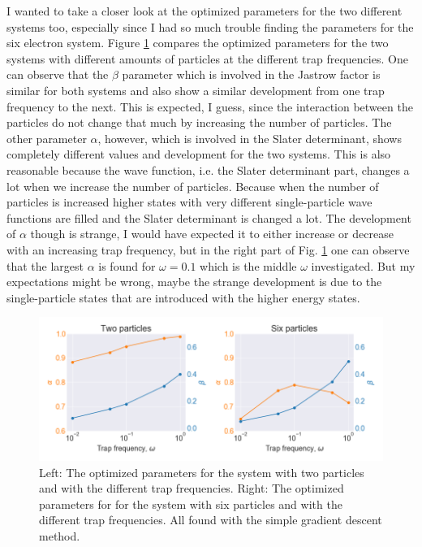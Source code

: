 I wanted to take a closer look at the optimized parameters for the two different systems too, especially since I had so much trouble finding the parameters for the six electron system. Figure \ref{fig:parameters_compared} compares the optimized parameters for the two systems with different amounts of particles at the different trap frequencies. One can observe that the $\beta$ parameter which is involved in the Jastrow factor is similar for both systems and also show a similar development from one trap frequency to the next. This is expected, I guess, since the interaction between the particles do not change that much by increasing the number of particles. The other parameter $\alpha$, however, which is involved in the Slater determinant, shows completely different values and development for the two systems. This is also reasonable because the wave function, i.e. the Slater determinant part, changes a lot when we increase the number of particles. Because when the number of particles is increased higher states with very different single-particle wave functions are filled and the Slater determinant is changed a lot. The development of $\alpha$ though is strange, I would have expected it to either increase or decrease with an increasing trap frequency, but in the right part of Fig. \ref{fig:parameters_compared} one can observe that the largest $\alpha$ is found for $\omega = 0.1$ which is the middle $\omega$ investigated. But my expectations might be wrong, maybe the strange development is due to the single-particle states that are introduced with the higher energy states. 

\begin{figure}[H]
\center
\includegraphics[width=0.85\linewidth]{../Results/parameters_compared}\caption{Left: The optimized parameters for the system with two particles and with the different trap frequencies. Right: The optimized parameters for  for the system with six particles and with the different trap frequencies. All found with the simple gradient descent method.}\label{fig:parameters_compared}
\end{figure}

